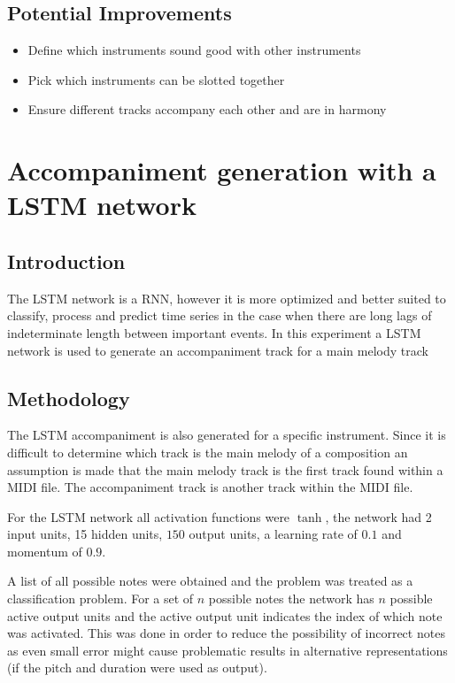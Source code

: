 \section{Potential Improvements}
\begin{itemize}
\item Define which instruments sound good with other instruments
\item Pick which instruments can be slotted together
\item Ensure different tracks accompany each other and are in harmony
\end{itemize}

\chapter{Accompaniment generation with a LSTM network} \label{ch:accomp_lstm}
\section{Introduction}
The \ac{LSTM} network is a \acf{RNN}, however it is more optimized and better suited to classify, process and predict time series in the case when there are long lags of indeterminate length between important events. In this experiment a \ac{LSTM} network is used to generate an accompaniment track for a main melody track

\section{Methodology}
The \ac{LSTM} accompaniment is also generated for a specific instrument. 
Since it is difficult to determine which track is the main melody of a composition an assumption is made that the main melody track is the first track found within a \ac{MIDI} file. The accompaniment track is another track within the \ac{MIDI} file.

For the LSTM network all activation functions were $\tanh$, the network had 2 input units, 15 hidden units, $150$ output units, a learning rate of $0.1$ and momentum of $0.9$.

A list of all possible notes were obtained and the problem was treated as a classification problem. For a set of $n$ possible notes the network has $n$ possible active output units and the active output unit indicates the index of which note was activated. This was done in order to reduce the possibility of incorrect notes as even small error might cause problematic results in alternative representations (if the pitch and duration were used as output).

